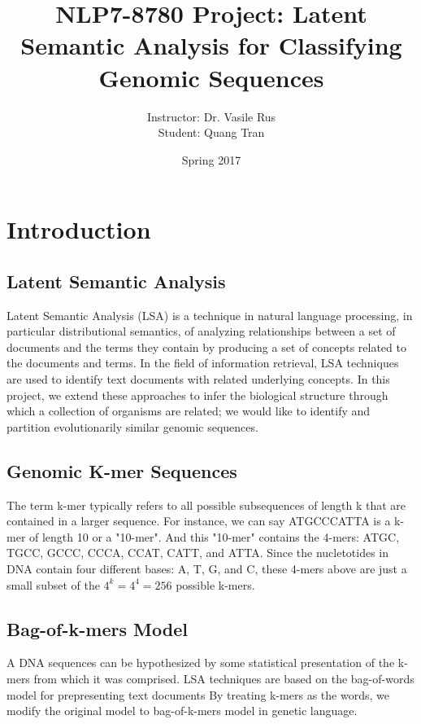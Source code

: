 \documentclass[12pt]{article}
\begin{document}
\title{NLP7-8780 Project: \textbf{Latent Semantic Analysis for Classifying Genomic Sequences}}
\author{Instructor: Dr. Vasile Rus \\ Student: Quang Tran}
\date{Spring 2017}
\maketitle


\section{Introduction}

\subsection{Latent Semantic Analysis}
Latent Semantic Analysis (LSA) is a technique in natural language processing, in particular distributional semantics, of analyzing relationships between a set of documents and the terms they contain by producing a set of concepts related to the documents and terms. In the field of information retrieval, LSA techniques are used to identify text
documents with related underlying concepts. In this project, we extend these approaches to infer the biological structure through which a collection of organisms are related; we would like to identify and partition evolutionarily similar genomic sequences.

\subsection{Genomic K-mer Sequences}
The term k-mer typically refers to all possible subsequences of length k that are contained in a larger sequence. For instance, we can say ATGCCCATTA is a k-mer of length 10 or a "10-mer". And this "10-mer" contains the 4-mers: ATGC, TGCC, GCCC, CCCA, CCAT, CATT, and ATTA. Since the nucletotides in DNA contain four different bases: A, T, G, and C, these 4-mers above are just a small subset of the $4^k = 4^4 = 256$ possible k-mers.

\subsection{Bag-of-k-mers Model}
A DNA sequences can be hypothesized by some statistical presentation of the k-mers from which it was comprised. LSA techniques are based on the bag-of-words model for prepresenting text documents By treating k-mers as the words, we modify the original model to bag-of-k-mers model in genetic language. 
\end{document}
